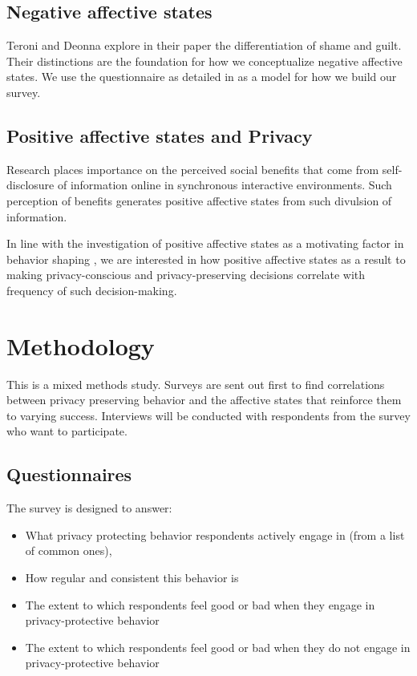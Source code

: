 \documentclass[acmtog]{acmart}
\begin{document}
\subsection{Negative affective states}
Teroni and Deonna explore in their paper the differentiation of shame and guilt.
Their distinctions are the foundation for how we conceptualize negative
affective states. We use the questionnaire as detailed in \cite{Rusch2007} as a
model for how we build our survey.
\subsection{Positive affective states and Privacy}
Research places importance on the perceived social benefits that come from
self-disclosure of information online in synchronous interactive
environments\cite{Jian2013}. Such perception of benefits generates positive
affective states from such divulsion of information.

In line with the investigation of positive affective states as a motivating
factor in behavior shaping \cite{Taneja2014}, we are interested in how positive
affective states as a result to making privacy-conscious and privacy-preserving
decisions correlate with frequency of such decision-making.


\section{Methodology}
This is a mixed methods study. Surveys are sent out first to find correlations
between privacy preserving behavior and the affective states that reinforce them
to varying success. Interviews will be conducted with respondents from the
survey who want to participate.
\subsection{Questionnaires}
\nopagebreak The survey is designed to answer:
\begin{itemize}
    \item What privacy protecting behavior respondents actively engage in (from
	a list of common ones),
    \item How regular and consistent this behavior is
    \item The extent to which respondents feel good or bad when they engage in
	privacy-protective behavior
    \item The extent to which respondents feel good or bad when they do not
	engage in privacy-protective behavior
\end{itemize}
\end{document}
